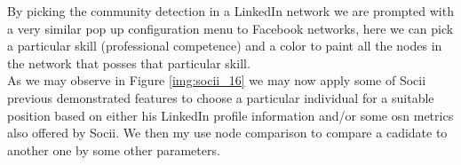 \indent By picking the community detection in a LinkedIn network we are prompted with a very similar pop up configuration menu to Facebook networks, here we can pick a particular skill (professional competence) and a color to paint all the nodes in the network that posses that particular skill.\\
\indent As we may observe in Figure \ref{img:socii_16} we may now apply some of Socii previous demonstrated features to choose a particular individual for a suitable position based on either his LinkedIn profile information and/or some \gls{osn} metrics also offered by Socii. We then my use node comparison to compare a cadidate to another one by some other parameters.
